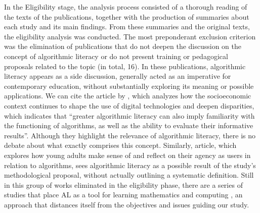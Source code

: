 In the Eligibility stage, the analysis process consisted of a thorough reading of the texts of the publications, together with the production of summaries about each study and its main findings. From these summaries and the original texts, the eligibility analysis was conducted. The most preponderant exclusion criterion was the elimination of publications that do not deepen the discussion on the concept of algorithmic literacy or do not present training or pedagogical proposals related to the topic (in total, 16). In these publications, algorithmic literacy appears as a side discussion, generally acted as an imperative for contemporary education, without substantially exploring its meaning or possible applications. We can cite the article by \textcite[p. 759]{Cotter2020}, which analyzes how the socioeconomic context continues to shape the use of digital technologies and deepen disparities, which indicates that “greater algorithmic literacy can also imply familiarity with the functioning of algorithms, as well as the ability to evaluate their informative results”. Although they highlight the relevance of algorithmic literacy, there is no debate about what exactly comprises this concept. Similarly,  article, which explores how young adults make sense of and reflect on their agency as users in relation to algorithms, sees algorithmic literacy as a possible result of the study's methodological proposal, without actually outlining a systematic definition. Still in this group of works eliminated in the eligibility phase, there are a series of studies that place AL as a tool for learning mathematics and computing \cite{Astambayeva2021,How2022}, an approach that distances itself from the objectives and issues guiding our study.
